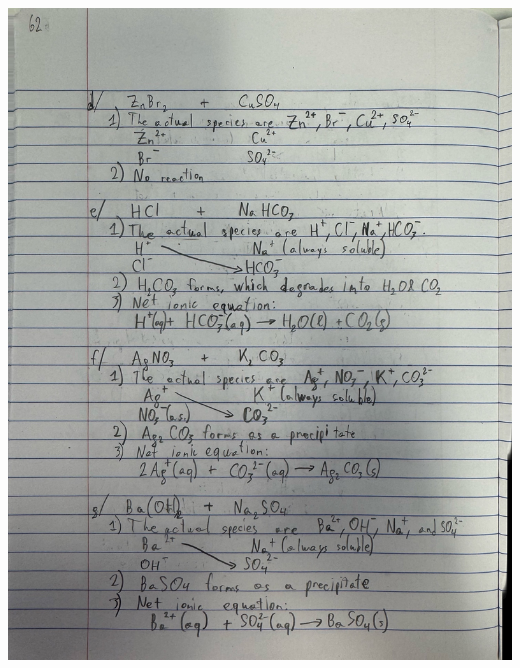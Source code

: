 \documentclass[10pt]{article}
\begin{document}
\begin{center}
                \includegraphics[width=\textwidth, trim={5in 2in 3in 39in},clip]{"Answers Images/IMG_6648.jpg"}


\end{center}
\end{document}
